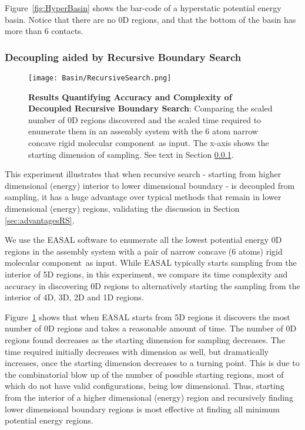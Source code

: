 \documentclass[]{article}
\newcommand{\figref}[1]{Figure~\ref{#1}}
\newcommand{\rmc}{rigid molecular component}
\begin{document}
\figref{fig:HyperBasin} shows the bar-code of a hyperstatic potential energy
basin. Notice that there are no 0D regions, and that the bottom of the basin
has more than 6 contacts.
\subsubsection{Decoupling aided by Recursive Boundary Search}
\label{sec:results:interiorPoint}
\begin{figure}[htbp]
\centering
\texttt{[image: Basin/RecursiveSearch.png]}
\caption{\scriptsize \textbf{Results Quantifying Accuracy and 
Complexity of Decoupled Recursive Boundary Search}:
Comparing the scaled number of 0D regions discovered and the scaled time 
required to enumerate them in an assembly system with the 6 atom narrow 
concave \rmc\ as input. The x-axis shows the starting dimension of sampling. 
See text in Section \ref{sec:results:interiorPoint}. 
}
\label{fig:0D} 
\end{figure}
This experiment illustrates that when recursive search - starting from higher
dimensional (energy) interior to lower dimensional boundary - is decoupled from
sampling, it has a huge advantage over typical methods that remain in lower
dimensional (energy) regions, validating the discussion in Section
\ref{sec:advantagesRS}. 

We use the EASAL software to enumerate all the lowest potential energy 0D
regions in the assembly system with a pair of narrow concave (6 atoms)
\rmc\ as input. While EASAL typically starts sampling from the interior of
5D regions, in this experiment, we compare its time complexity and accuracy in
discovering 0D regions to alternatively starting the sampling from the interior
of 4D, 3D, 2D and 1D regions.

\figref{fig:0D} shows that when EASAL starts from 5D regions it discovers the
most number of 0D regions and takes a reasonable amount of time. The number of
0D regions found decreases as the starting dimension for sampling decreases.
The time required initially decreases with dimension as well, but dramatically
increases, once the starting dimension decreases to a turning point. This is
due to the combinatorial blow up of the number of possible starting regions,
most of which do not have valid configurations, being low dimensional. Thus,
starting from the interior of a higher dimensional (energy) region and
recursively finding lower dimensional boundary regions is most effective at
finding all minimum potential energy regions. 
\end{document}
